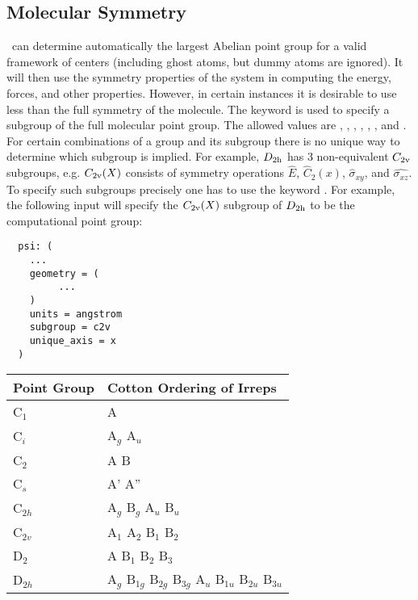 \subsection{Molecular Symmetry} \label{symm-spec}
\PSIthree\ can determine automatically the largest Abelian point group
for a valid framework of centers (including ghost atoms, but dummy
atoms are ignored).  It will then use the symmetry properties of the
system in computing the energy, forces, and other properties.
However, in certain instances it is desirable to use less than the
full symmetry of the molecule. The keyword  is used
to specify a subgroup of the full molecular point group. The allowed
values are , , , ,
, , and . For certain combinations
of a group and its subgroup there is no unique way to determine which
subgroup is implied. For example, $D_{\rm 2h}$ has 3 non-equivalent
$C_{\rm 2v}$ subgroups, e.g. $C_{\rm 2v}(X)$ consists of symmetry
operations $\hat{E}$, $\hat{C}_2(x)$, $\hat{\sigma}_{xy}$, and
$\hat{\sigma_{xz}}$.  To specify such subgroups precisely one has to
use the keyword .  For example, the following
input will specify the $C_{\rm 2v}(X)$ subgroup of $D_{\rm 2h}$ to be
the computational point group:
\begin{verbatim}
  psi: (
    ...
    geometry = (
         ...
    )
    units = angstrom
    subgroup = c2v
    unique_axis = x
  )
\end{verbatim}

\begin{table}[h]
\begin{center}
\begin{tabular}{ll}
\hline
\hline
Point Group & Cotton Ordering of Irreps \\
\hline
C$_1$       & A                                    \\
C$_i$       & A$_g$ A$_u$                          \\
C$_2$       & A B                                  \\
C$_s$       & A' A''                               \\
C$_{2h}$    & A$_g$ B$_g$ A$_u$ B$_u$              \\
C$_{2v}$    & A$_1$ A$_2$ B$_1$ B$_2$              \\
D$_2$       & A B$_1$ B$_2$ B$_3$                  \\
D$_{2h}$    & A$_g$ B$_{1g}$ B$_{2g}$ B$_{3g}$ A$_u$ B$_{1u}$ B$_{2u}$ B$_{3u}$ \\
\hline
\hline
\end{tabular}
\end{center}
\end{table}

